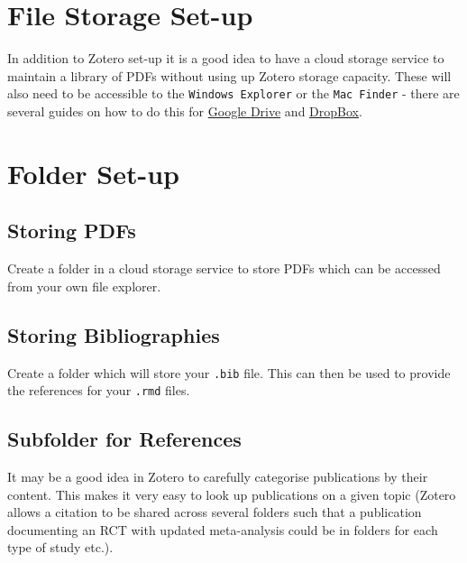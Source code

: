 \documentclass[
]{book}
\begin{document}
\hypertarget{file-storage-set-up}{%
\section{File Storage Set-up}\label{file-storage-set-up}}

In addition to Zotero set-up it is a good idea to have a cloud storage service to maintain a library of PDFs without using up Zotero storage capacity. These will also need to be accessible to the \texttt{Windows\ Explorer} or the \texttt{Mac\ Finder} - there are several guides on how to do this for \href{https://www.howtogeek.com/228989/how-to-use-the-desktop-google-drive-app/}{Google Drive} and \href{https://www.dropboxforum.com/t5/Installation-and-desktop-app/How-do-I-put-Dropbox-on-my-File-Explorer-in-Win-10/td-p/313031}{DropBox}.

\hypertarget{folder-set-up}{%
\section{Folder Set-up}\label{folder-set-up}}

\hypertarget{storing-pdfs}{%
\subsection{Storing PDFs}\label{storing-pdfs}}

Create a folder in a cloud storage service to store PDFs which can be accessed from your own file explorer.

\hypertarget{storing-bibliographies}{%
\subsection{Storing Bibliographies}\label{storing-bibliographies}}

Create a folder which will store your \texttt{.bib} file. This can then be used to provide the references for your \texttt{.rmd} files.

\hypertarget{subfolder-for-references}{%
\subsection{Subfolder for References}\label{subfolder-for-references}}

It may be a good idea in Zotero to carefully categorise publications by their content. This makes it very easy to look up publications on a given topic (Zotero allows a citation to be shared across several folders such that a publication documenting an RCT with updated meta-analysis could be in folders for each type of study etc.).
\end{document}
